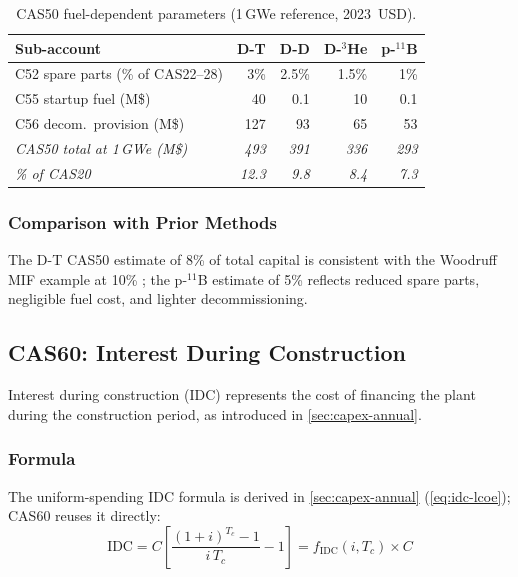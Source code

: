 \documentclass{article}
\begin{document}
\begin{table}[htbp]
\caption{CAS50 fuel-dependent parameters (1\,GWe reference, 2023~USD).}
\label{tab:cas50-fuel}
\centering
\begin{tabular}{lrrrr}
\toprule
Sub-account & D-T & D-D & D-${}^3$He & p-${}^{11}$B \\
\midrule
C52 spare parts (\% of CAS22--28) & 3\% & 2.5\% & 1.5\% & 1\% \\
C55 startup fuel (M\$) & 40 & 0.1 & 10 & 0.1 \\
C56 decom.\ provision (M\$) & 127 & 93 & 65 & 53 \\
\midrule
\textit{CAS50 total at 1\,GWe (M\$)} & \textit{493} & \textit{391} & \textit{336} & \textit{293} \\
\textit{\% of CAS20} & \textit{12.3} & \textit{9.8} & \textit{8.4} & \textit{7.3} \\
\bottomrule
\end{tabular}
\end{table}

\subsubsection{Comparison with Prior Methods}
The D-T CAS50 estimate of 8\% of total capital is consistent with the
Woodruff MIF example at 10\% \citep{woodruff2026}; the p-${}^{11}$B
estimate of 5\% reflects reduced spare parts, negligible fuel cost,
and lighter decommissioning.


\subsection{CAS60: Interest During Construction}
\label{sec:cas60}

Interest during construction (IDC) represents the cost of financing
the plant during the construction period, as introduced in
\cref{sec:capex-annual}.

\subsubsection{Formula}
The uniform-spending IDC formula is derived in \cref{sec:capex-annual}
(\cref{eq:idc-lcoe}); CAS60 reuses it directly:
\begin{equation}
\label{eq:idc}
\text{IDC} = C \left[ \frac{(1+i)^{T_c} - 1}{i\,T_c} - 1 \right]
           = f_{\text{IDC}}(i, T_c) \times C
\end{equation}
\end{document}
